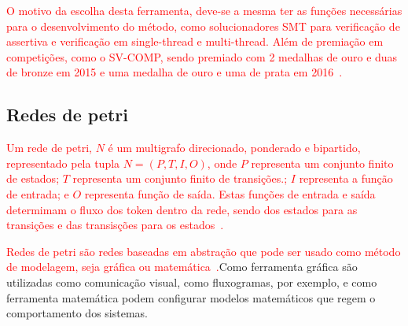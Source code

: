 
\par
\textcolor{red}{O motivo da escolha desta ferramenta, deve-se a mesma ter as funções necessárias para o desenvolvimento do método, como solucionadores SMT para verificação de assertiva e verificação em single-thread e multi-thread. Além de premiação em competições, como o SV-COMP, sendo premiado com 2 medalhas de ouro e duas de bronze em 2015 e uma medalha de ouro e uma de prata em 2016~\cite{esbmc}.}
\subsection{Redes de petri}
\par
\textcolor{red}{Um rede de petri, $N$ é um multigrafo direcionado, ponderado e bipartido, representado pela tupla $N=(P,T,I,O)$, onde $P$ representa um conjunto finito de estados; $T$ representa um conjunto finito de transições.; $I$ representa a função de entrada; e $O$ representa função de saída. Estas funções de entrada e saída determimam o fluxo dos token dentro da rede, sendo dos estados para as transições e das transisções para os estados~\cite{halder2006}.}


\textcolor{red}{Redes de petri são redes baseadas em abstração que pode ser usado como método de modelagem, seja gráfica ou matemática~\cite{halder2006}.}Como ferramenta gráfica são utilizadas como comunicação visual, como fluxogramas, por exemplo, e como ferramenta matemática podem configurar modelos matemáticos que regem o comportamento dos sistemas\cite{murata1989petri}. 

